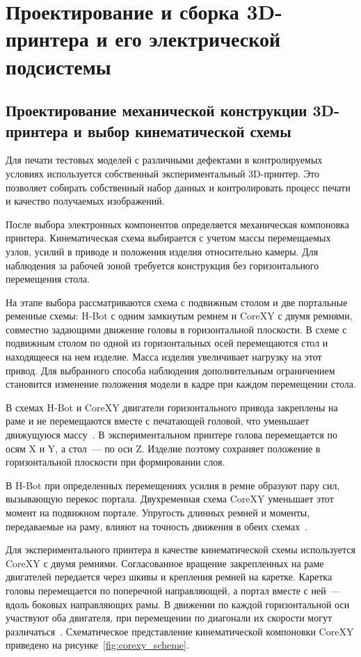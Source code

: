\chapter{Проектирование и сборка 3D-принтера и его электрической подсистемы}

\section{Проектирование механической конструкции 3D-принтера и выбор кинематической схемы}

Для печати тестовых моделей с различными дефектами в контролируемых условиях используется собственный экспериментальный 3D-принтер. Это позволяет собирать собственный набор данных и контролировать процесс печати и качество получаемых изображений.

После выбора электронных компонентов определяется механическая компоновка принтера. Кинематическая схема выбирается с учетом массы перемещаемых узлов, усилий в приводе и положения изделия относительно камеры. Для наблюдения за рабочей зоной требуется конструкция без горизонтального перемещения стола.

На этапе выбора рассматриваются схема с подвижным столом и две портальные ременные схемы: H-Bot с одним замкнутым ремнем и CoreXY с двумя ремнями, совместно задающими движение головы в горизонтальной плоскости. В схеме с подвижным столом по одной из горизонтальных осей перемещаются стол и находящееся на нем изделие. Масса изделия увеличивает нагрузку на этот привод. Для выбранного способа наблюдения дополнительным ограничением становится изменение положения модели в кадре при каждом перемещении стола.

В схемах H-Bot и CoreXY двигатели горизонтального привода закреплены на раме и не перемещаются вместе с печатающей головой, что уменьшает движущуюся массу~\cite{ida2022parallel}. В экспериментальном принтере голова перемещается по осям X и Y, а стол~--- по оси Z. Изделие поэтому сохраняет положение в горизонтальной плоскости при формировании слоя.

В H-Bot при определенных перемещениях усилия в ремне образуют пару сил, вызывающую перекос портала. Двухременная схема CoreXY уменьшает этот момент на подвижном портале. Упругость длинных ремней и моменты, передаваемые на раму, влияют на точность движения в обеих схемах~\cite{ida2022parallel}.

Для экспериментального принтера в качестве кинематической схемы используется CoreXY с двумя ремнями. Согласованное вращение закрепленных на раме двигателей передается через шкивы и крепления ремней на каретке. Каретка головы перемещается по поперечной направляющей, а портал вместе с ней~--- вдоль боковых направляющих рамы. В движении по каждой горизонтальной оси участвуют оба двигателя, при перемещении по диагонали их скорости могут различаться~\cite{ida2022parallel}. Схематическое представление кинематической компоновки CoreXY приведено на рисунке~\ref{fig:corexy_scheme}.

